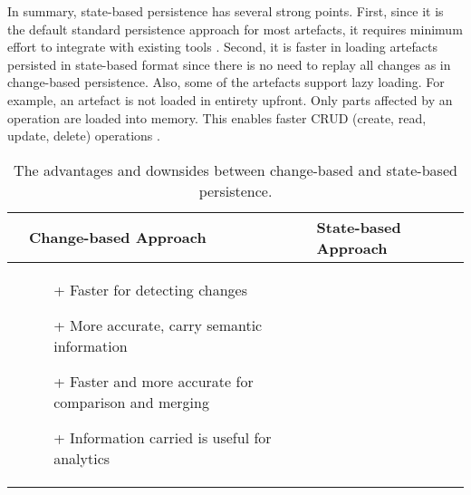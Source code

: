 In summary, state-based persistence has several strong points. First, since it is the default standard persistence approach for most artefacts, it requires minimum effort to integrate with existing tools \cite{koegel2010emfstore}. Second, it is faster in loading artefacts persisted in state-based format since there is no need to replay all changes as in change-based persistence. Also, some of the artefacts support lazy loading. For example, an artefact is not loaded in entirety upfront. Only parts affected by an operation are loaded into memory. This enables faster CRUD (create, read, update, delete) operations \cite{DBLP:conf/models/Espinazo-PaganCM11,daniel2016neoemf}. 

\begin{table*}[h]
  \centering
  \caption{The advantages and downsides between change-based and state-based persistence.}
  \label{table:advantages_drawbacks}
\begin{scriptsize}
    \begin{tabular}
      {|>{\centering\arraybackslash}p{1.1cm}|>{\centering\arraybackslash}p{1.1cm}|>{\centering\arraybackslash}p{5cm}|>{\centering\arraybackslash}p{5cm}|}
      \hline 
      \multicolumn{2}{|c|}{\textbf{Dimensions}}&\textbf{Change-based Approach}&\textbf{State-based Approach}\\
      \hline 
      \multicolumn{2}{|p{2.2cm}|}{\centering Advantages} &
      \begin{minipage}[t]{5cm}
        \begin{itemize}[leftmargin=9pt]
          \setlength\itemsep{2pt}
          \item[+] Faster for detecting changes \cite{DBLP:conf/edoc/KoegelHLHD10}
          \item[+] More accurate, carry semantic information \cite{DBLP:journals/entcs/RobbesL07,DBLP:conf/sde/LippeO92,DBLP:conf/caise/IgnatN05,mens2002state}  
          \item[+] Faster and more accurate for comparison and merging \cite{DBLP:conf/sde/LippeO92,DBLP:conf/caise/IgnatN05,koegel2010emfstore}
          \item[+] Information carried is useful for analytics \cite{DBLP:journals/entcs/RobbesL07}
        \end{itemize}
      \end{minipage}
      & 
      \begin{minipage}[t]{5cm}
        \raggedright
        \begin{itemize}[leftmargin=9pt]
          \setlength\itemsep{2pt}

\end{itemize}
\end{minipage}
\end{tabular}
\end{scriptsize}
\end{table*}
